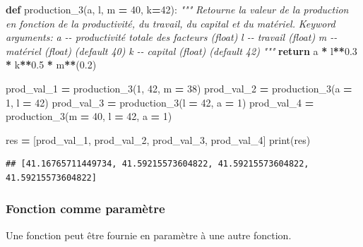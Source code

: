 \documentclass[
  12pt,
]{book}
\newenvironment{Shaded}{\begin{snugshade}}{\end{snugshade}}
\newcommand{\BuiltInTok}[1]{#1}
\newcommand{\CommentTok}[1]{\textcolor[rgb]{0.56,0.35,0.01}{\textit{#1}}}
\newcommand{\ControlFlowTok}[1]{\textcolor[rgb]{0.13,0.29,0.53}{\textbf{#1}}}
\newcommand{\DecValTok}[1]{\textcolor[rgb]{0.00,0.00,0.81}{#1}}
\newcommand{\FloatTok}[1]{\textcolor[rgb]{0.00,0.00,0.81}{#1}}
\newcommand{\KeywordTok}[1]{\textcolor[rgb]{0.13,0.29,0.53}{\textbf{#1}}}
\newcommand{\NormalTok}[1]{#1}
\newcommand{\OperatorTok}[1]{\textcolor[rgb]{0.81,0.36,0.00}{\textbf{#1}}}
\numberwithin{equation}{section}
\numberwithin{countremarque}{section}
\begin{document}
\begin{Shaded}
\begin{Highlighting}[]
\KeywordTok{def}\NormalTok{ production\_3(a, l, m }\OperatorTok{=} \DecValTok{40}\NormalTok{, k}\OperatorTok{=}\DecValTok{42}\NormalTok{):}
  \CommentTok{"""}
\CommentTok{  Retourne la valeur de la production en fonction}
\CommentTok{  de la productivité, du travail, du capital et du matériel.}
\CommentTok{  }
\CommentTok{  Keyword arguments:}
\CommentTok{  a {-}{-} productivité totale des facteurs (float)}
\CommentTok{  l {-}{-} travail (float)}
\CommentTok{  m {-}{-} matériel (float) (default 40)}
\CommentTok{  k {-}{-} capital (float) (default 42)}
\CommentTok{  """}
  \ControlFlowTok{return}\NormalTok{ a }\OperatorTok{*}\NormalTok{ l}\OperatorTok{**}\FloatTok{0.3} \OperatorTok{*}\NormalTok{ k}\OperatorTok{**}\FloatTok{0.5} \OperatorTok{*}\NormalTok{ m}\OperatorTok{**}\NormalTok{(}\FloatTok{0.2}\NormalTok{)}
  
\NormalTok{prod\_val\_1 }\OperatorTok{=}\NormalTok{ production\_3(}\DecValTok{1}\NormalTok{, }\DecValTok{42}\NormalTok{, m }\OperatorTok{=} \DecValTok{38}\NormalTok{)}
\NormalTok{prod\_val\_2 }\OperatorTok{=}\NormalTok{ production\_3(a }\OperatorTok{=} \DecValTok{1}\NormalTok{, l }\OperatorTok{=} \DecValTok{42}\NormalTok{)}
\NormalTok{prod\_val\_3 }\OperatorTok{=}\NormalTok{ production\_3(l }\OperatorTok{=} \DecValTok{42}\NormalTok{, a }\OperatorTok{=} \DecValTok{1}\NormalTok{)}
\NormalTok{prod\_val\_4 }\OperatorTok{=}\NormalTok{ production\_3(m }\OperatorTok{=} \DecValTok{40}\NormalTok{, l }\OperatorTok{=} \DecValTok{42}\NormalTok{, a }\OperatorTok{=} \DecValTok{1}\NormalTok{)}

\NormalTok{res }\OperatorTok{=}\NormalTok{ [prod\_val\_1, prod\_val\_2, prod\_val\_3, prod\_val\_4]}
\BuiltInTok{print}\NormalTok{(res)}
\end{Highlighting}
\end{Shaded}

\begin{lstlisting}
## [41.16765711449734, 41.59215573604822, 41.59215573604822, 41.59215573604822]
\end{lstlisting}

\subsubsection{Fonction comme paramètre}\label{fonction-comme-paramuxe8tre}

Une fonction peut être fournie en paramètre à une autre fonction.
\end{document}
